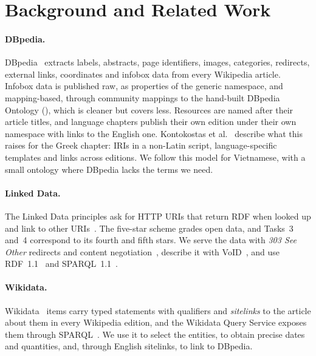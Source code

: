 \section{Background and Related Work}
\label{sec:related}

\paragraph{DBpedia.} DBpedia~\cite{auer2007dbpedia, lehmann2015dbpedia} extracts
labels, abstracts, page identifiers, images, categories, redirects, external
links, coordinates and infobox data from every Wikipedia article. Infobox data
is published raw, as properties of the generic  namespace, and
mapping-based, through community mappings to the hand-built DBpedia Ontology
(), which is cleaner but covers less. Resources are named after
their article titles, and language chapters publish their own edition under
their own namespace with links to the English one. Kontokostas et
al.~\cite{kontokostas2012greek} describe what this raises for the Greek
chapter: IRIs in a non-Latin script, language-specific templates and links
across editions. We follow this model for Vietnamese, with a small ontology
where DBpedia lacks the terms we need.

\paragraph{Linked Data.} The Linked Data principles ask for HTTP URIs that return
RDF when looked up and link to other
URIs~\cite{bernerslee2006linked, heath2011linked}. The five-star scheme grades
open data, and Tasks~3 and~4 correspond to its fourth and fifth stars. We serve
the data with \emph{303 See Other} redirects and content
negotiation~\cite{sauermann2008cooluris, hyland2014bestpractices}, describe it
with VoID~\cite{alexander2011void}, and use RDF~1.1~\cite{cyganiak2014rdf} and
SPARQL~1.1~\cite{harris2013sparql}.

\paragraph{Wikidata.} Wikidata~\cite{vrandecic2014wikidata} items carry typed
statements with qualifiers and \emph{sitelinks} to the article about them in
every Wikipedia edition, and the Wikidata Query Service exposes them through
SPARQL~\cite{malyshev2018wdqs}. We use it to select the entities, to obtain
precise dates and quantities, and, through English sitelinks, to link to DBpedia.

